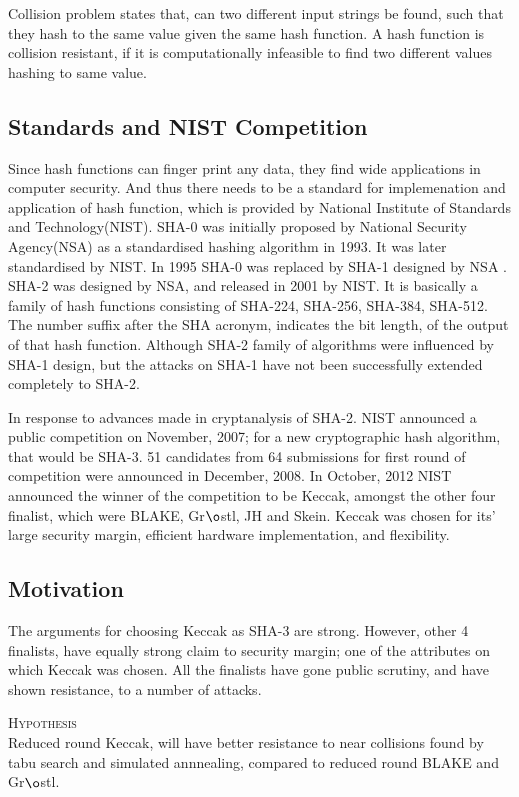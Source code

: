 \documentclass[12pt]{artikel3}                  %
\begin{document}
Collision problem states that, can two different input strings be found, such that they hash to the same
 value given the same hash function. A hash function is collision resistant, if it is computationally
 infeasible to find two different values hashing to same value.

\subsection{Standards and NIST Competition}

Since hash functions can finger print any data, they find wide applications in computer security. And thus there
needs to be a standard for implemenation and application of hash function, which is provided by National Institute
of Standards and Technology(NIST). SHA-0 was initially proposed by National Security Agency(NSA) as a standardised
hashing algorithm in 1993. It was later standardised by NIST. In 1995 SHA-0 was replaced by SHA-1 designed by NSA
\cite{00006, 00007}. SHA-2 was designed by NSA, and released in 2001 by NIST. It is basically a family of hash 
functions consisting of SHA-224, SHA-256, SHA-384, SHA-512. The number suffix after the SHA acronym, indicates the 
bit length, of the output of that hash function. Although SHA-2 family of algorithms were influenced by SHA-1 
design, but the attacks on SHA-1 have not been successfully extended completely to SHA-2.

In response to advances made in cryptanalysis of SHA-2. NIST announced a public competition on November, 2007;
for a new cryptographic hash algorithm, that would be SHA-3. 51 candidates from 64 submissions for first round 
of competition were announced in December, 2008. In October, 2012 NIST announced the winner of the competition
to be Keccak, amongst the other four finalist, which were BLAKE, Gr$\o$stl, JH and Skein. Keccak was chosen for
its' large security margin, efficient hardware implementation, and flexibility.

\subsection{Motivation}

The arguments for choosing Keccak as SHA-3 are strong. However, other 4 finalists, have equally strong claim to
security margin; one of the attributes on which Keccak was chosen. All the finalists have gone public scrutiny,
and have shown resistance, to a number of attacks.

\vspace{3mm}
\begin{center}
  \framebox
  {
    \parbox{400pt}
    {
      \centering \textsc{Hypothesis} \\
      Reduced round Keccak, will have better resistance to near collisions found by tabu search and simulated
      annnealing, compared to reduced round BLAKE and Gr$\o$stl.
    }
  }
\end{center}
\vspace{3mm}
\end{document}
